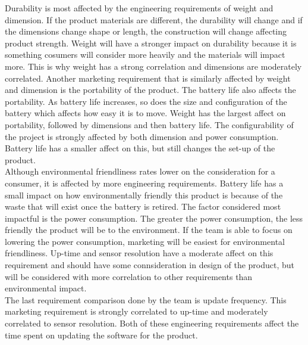 Durability is most affected by the engineering requirements of weight and dimension. If the product materials are different, the durability will change and if the dimensions change shape or length, the construction will change affecting product strength. Weight will have a stronger impact on durability because it is something cosumers will consider more heavily and the materials will impact more. This is why weight has a strong correlation and dimensions are moderately correlated. Another marketing requirement that is similarly affected by weight and dimension is the portability of the product. The battery life also affects the portability. As battery life increases, so does the size and configuration of the battery which affects how easy it is to move. Weight has the largest affect on portability, followed by dimensions and then battery life. The configurability of the project is strongly affected by both dimension and power consumption. Battery life has a smaller affect on this, but still changes the set-up of the product. \\

Although environmental friendliness rates lower on the consideration for a consumer, it is affected by more engineering requirements. Battery life has a small impact on how environmentally friendly this product is because of the waste that will exist once the battery is retired. The factor considered most impactful is the power consumption. The greater the power consumption, the less friendly the product will be to the environment. If the team is able to focus on lowering the power consumption, marketing will be easiest for environmental friendliness. Up-time and sensor resolution have a moderate affect on this requirement and should have some connsideration in design of the product, but will be considered with more correlation to other requirements than environmental impact. \\

The last requirement comparison done by the team is update frequency. This marketing requirement is strongly correlated to up-time and moderately correlated to sensor resolution. Both of these engineering requirements affect the time spent on updating the software for the product. \\

